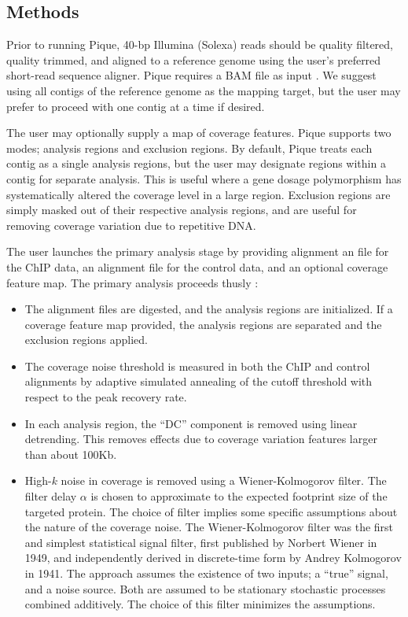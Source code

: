 \documentclass{bioinfo}
\begin{document}
\begin{methods}
\section{Methods}

\noindent Prior to running Pique, 40-bp Illumina (Solexa) reads should
be quality filtered, quality trimmed, and aligned to a reference
genome using the user's preferred short-read sequence aligner. Pique
requires a BAM file as input \cite{sam_format}. We suggest using all
contigs of the reference genome as the mapping target, but the user
may prefer to proceed with one contig at a time if desired. 

The user may optionally supply a map of coverage features. Pique
supports two modes; analysis regions and exclusion regions. By
default, Pique treats each contig as a single analysis regions, but
the user may designate regions within a contig for separate
analysis. This is useful where a gene dosage polymorphism has
systematically altered the coverage level in a large region. Exclusion
regions are simply masked out of their respective analysis regions,
and are useful for removing coverage variation due to repetitive DNA.

The user launches the primary analysis stage by providing alignment an
file for the ChIP data, an alignment file for the control data, and an
optional coverage feature map. The primary analysis proceeds thusly :

\begin{itemize}

\item The alignment files are digested, and the analysis regions are
  initialized. If a coverage feature map provided, the analysis
  regions are separated and the exclusion regions applied.

\item The coverage noise threshold is measured in both the ChIP and
  control alignments by adaptive simulated annealing of the cutoff
  threshold with respect to the peak recovery rate.

\item In each analysis region, the ``DC'' component is removed using
  linear detrending. This removes effects due to coverage variation
  features larger than about 100Kb.

\item High-$k$ noise in coverage is removed using a Wiener-Kolmogorov
  filter. The filter delay $\alpha$ is chosen to approximate to the
  expected footprint size of the targeted protein. The choice of
  filter implies some specific assumptions about the nature of the
  coverage noise. The Wiener-Kolmogorov filter was the first and
  simplest statistical signal filter, first published by Norbert
  Wiener in 1949, and independently derived in discrete-time form by
  Andrey Kolmogorov in 1941. The approach assumes the existence of two
  inputs; a ``true'' signal, and a noise source. Both are assumed to
  be stationary stochastic processes combined additively. The choice
  of this filter minimizes the assumptions.


\end{itemize}
\end{methods}
\end{document}
